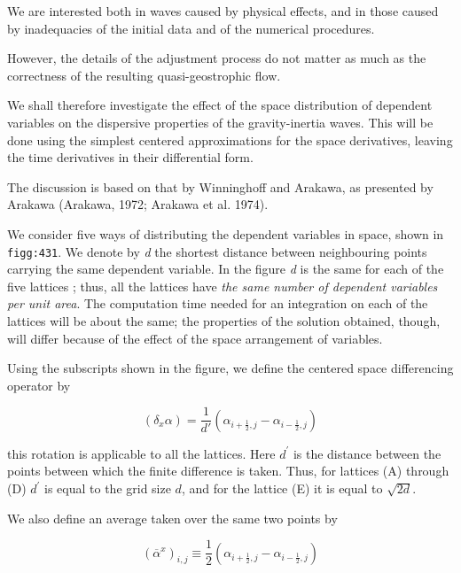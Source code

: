 We are interested both in waves caused by physical effects, and in those
caused by inadequacies of the initial data and of the numerical
procedures.

However, the details of the adjustment process do not matter as much as
the correctness of the resulting quasi-geostrophic flow.

We shall therefore investigate the effect of the space distribution of
dependent variables on the dispersive properties of the gravity-inertia
waves. This will be done using the simplest centered approximations for
the space derivatives, leaving the time derivatives in their
differential form.

The discussion is based on that by Winninghoff and Arakawa, as presented
by Arakawa (Arakawa, 1972; Arakawa et al. 1974).

We consider five ways of distributing the dependent variables in space,
shown in \texttt{figg:431}. We denote by \emph{d} the shortest distance
between neighbouring points carrying the same dependent variable. In the
figure \emph{d} is the same for each of the five lattices ; thus, all
the lattices have \emph{the same number of dependent variables per unit
area}. The computation time needed for an integration on each of the
lattices will be about the same; the properties of the solution
obtained, though, will differ because of the effect of the space
arrangement of variables.

Using the subscripts shown in the figure, we define the centered space
differencing operator by

\[(\delta_x\alpha) = \frac{1}{d'} \left( \alpha_{i+\frac{1}{2},j} - \alpha_{i-\frac{1}{2},j} \right)\]

this rotation is applicable to all the lattices. Here \(d^{'}\) is the
distance between the points between which the finite difference is
taken. Thus, for lattices (A) through (D) \(d^{'}\) is equal to the grid
size \(d\), and for the lattice (E) it is equal to \(\sqrt{2d}\).


We also define an average taken over the same two points by

\[\left( {\overline{\alpha}}^{x} \right)_{i,j} \equiv \frac{1}{2}\left( \alpha_{i + \frac{1}{2},j} - \alpha_{i - \frac{1}{2},j} \right)\]

